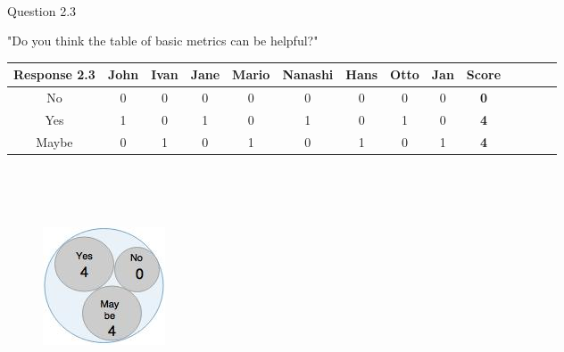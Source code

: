 \\
\begin{shaded} Question 2.3 \end{shaded} \label{question:hybris_architecture/interview/question_2.3}
"Do you think the table of basic metrics can be helpful?"\\
\begin{table}[H]
\centering
\begin{adjustbox}{max width=\textwidth}
\begin{tabular}{*{14}{|c}|}%
\hline
\textbf{Response 2.3}   & John & Ivan & Jane & Mario & Nanashi & Hans & Otto & Jan & \textbf{Score}\\
 \hline
No          & 0 & 0 & 0 & 0 & 0 & 0 & 0 & 0 & \textbf{0}    \\ 
 \hline
Yes                & 1 & 0 & 1 & 0 & 1 & 0 & 1 & 0 & \textbf{4}    \\ 
 \hline
Maybe                & 0 & 1 & 0 & 1 & 0 & 1 & 0 & 1 & \textbf{4}    \\ 
 \hline
 \hline
\end{tabular}
\end{adjustbox}
\label{tab:hybris_architecture/interview/question_2.3}
\end{table}
\\

\\
\begin{figure}[H]
\begin{center}
\includegraphics[scale=0.5]{figures/question2_3}
\label{fig:hybris_architecture/interview/question2-3}
\end{center}
\end{figure}
